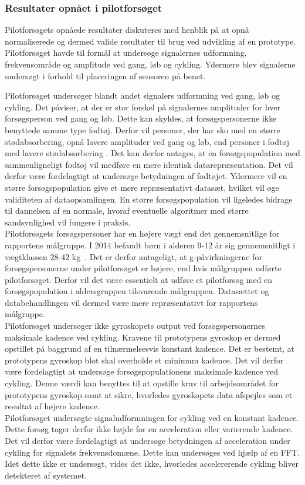\subsubsection{Resultater opnået i pilotforsøget}
Pilotforsøgets opnåede resultater diskuteres med henblik på at opnå normaliserede og dermed valide resultater til brug ved udvikling af en prototype.\\
Pilotforsøget havde til formål at undersøge signalernes udformning, frekvensområde og amplitude ved gang, løb og cykling. Ydermere blev signalerne undersøgt i forhold til placeringen af sensoren på benet. 

Pilotforsøget undersøger blandt andet signalers udformning ved gang, løb og cykling. Det påviser, at der er stor forskel på signalernes amplituder for hver forsøgsperson ved gang og løb. Dette kan skyldes, at forsøgspersonerne ikke benyttede samme type fodtøj. Derfor vil personer, der har sko med en større stødabsorbering, opnå lavere amplituder ved gang og løb, end personer i fodtøj med lavere stødabsorbering \citep{Novacheck1998}. Det kan derfor antages, at en forsøgspopulation med sammenligneligt fodtøj vil medføre en mere identisk datarepræsentation. Det vil derfor være fordelagtigt at undersøge betydningen af fodtøjet. Ydermere vil en større forsøgspopulation give et mere repræsentativt datasæt, hvilket vil øge validiteten af dataopsamlingen. En større forsøgspopulation vil ligeledes bidrage til dannelsen af en normale, hvoraf eventuelle algoritmer med større sandsynlighed vil fungere i praksis.\\
Pilotforsøgets forsøgspersoner har en højere vægt end det gennemsnitlige for rapportens målgruppe. I 2014 befandt børn i alderen 9-12 år sig gennemsnitligt i vægtklassen 28-42 kg~\citep{Rigsholspitalet2014}. Det er derfor antageligt, at g-påvirkningerne for forsøgspersonerne under pilotforsøget er højere, end hvis målgruppen udførte pilotforsøget. Derfor vil det være essentielt at udføre et pilotforsøg med en forsøgspopulation i aldersgruppen tilsvarende målgruppen. Datasættet og databehandlingen vil dermed være mere repræsentativt for rapportens målgruppe.\\
Pilotforsøget undersøger ikke gyroskopets output ved forsøgspersonernes maksimale kadence ved cykling. Kravene til prototypens gyroskop er dermed opstillet på baggrund af en tilnærmelsesvis konstant kadence. Det er bestemt, at prototypens gyroskop blot skal overholde et minimum kadence. Det vil derfor være fordelagtigt at undersøge forsøgspopulationens maksimale kadence ved cykling. Denne værdi kan benyttes til at opstille krav til arbejdsområdet for prototypens gyroskop samt at sikre, hvorledes gyroskopets data afspejles som et resultat af højere kadence.\\
Pilotforsøget undersøgte signaludformningen for cykling ved en konstant kadence. Dette forsøg tager derfor ikke højde for en acceleration eller varierende kadence. Det vil derfor være fordelagtigt at undersøge betydningen af acceleration under cykling for signalets frekvensdomæne. Dette kan undersøges ved hjælp af en FFT. Idet dette ikke er undersøgt, vides det ikke, hvorledes accelererende cykling bliver detekteret af systemet.

